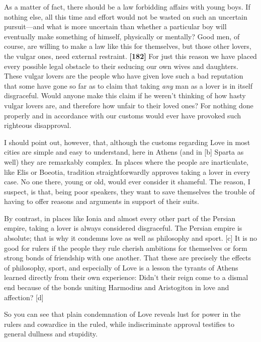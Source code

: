 As a matter of fact, there should be a law forbidding affairs with young
boys. If nothing else, all this time and effort would not be wasted on
such an uncertain pursuit---and what is more uncertain than whether a
particular boy will eventually make something of himself, physically or
mentally? Good men, of course, are willing to make a law like this for
themselves, but those other lovers, the vulgar ones, need external
restraint. {\bf {[}182{]}} For just this reason we have placed every
possible legal obstacle to their seducing our own wives and daughters.
These vulgar lovers are the people who have given love such a bad
reputation that some have gone so far as to claim that taking {\em any}
man as a lover is in itself disgraceful. Would anyone make this claim if
he weren't thinking of how hasty vulgar lovers are, and therefore how
unfair to their loved ones? For nothing done properly and in accordance
with our customs would ever have provoked such righteous disapproval.

I should point out, however, that, although the customs regarding Love
in most cities are simple and easy to understand, here in Athens (and in
{[}b{]} Sparta as well) they are remarkably complex. In places where the
people are inarticulate, like Elis or Boeotia, tradition
straightforwardly approves taking a lover in every case. No one there,
young or old, would ever consider it shameful. The reason, I suspect, is
that, being poor speakers, they want to save themselves the trouble of
having to offer reasons and arguments in support of their suits.

By contrast, in places like Ionia and almost every other part of the
Persian empire, taking a lover is always considered disgraceful. The
Persian empire is absolute; that is why it condemns love as well as
philosophy and sport. {[}c{]} It is no good for rulers if the people
they rule cherish ambitions for themselves or form strong bonds of
friendship with one another. That these are precisely the effects of
philosophy, sport, and especially of Love is a lesson the tyrants of
Athens learned directly from their own experience: Didn't their reign
come to a dismal end because of the bonds uniting Harmodius and
Aristogiton in love and
affection? {[}d{]}

So you can see that plain condemnation of Love reveals lust for power in
the rulers and cowardice in the ruled, while indiscriminate approval
testifies to general dullness and stupidity.

